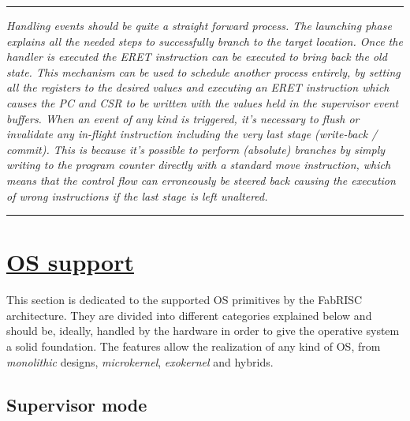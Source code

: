 \documentclass{article}
\begin{document}
        \par\noindent\rule{\textwidth}{0.4pt}
        \textit{Handling events should be quite a straight forward process. The launching phase explains all the needed steps to successfully branch to the target location. Once the handler is executed the ERET instruction can be executed to bring back the old state. This mechanism can be used to schedule another process entirely, by setting all the registers to the desired values and executing an ERET instruction which causes the PC and CSR to be written with the values held in the supervisor event buffers. When an event of any kind is triggered, it's necessary to flush or invalidate any in-flight instruction including the very last stage (write-back / commit). This is because it's possible to perform (absolute) branches by simply writing to the program counter directly with a standard move instruction, which means that the control flow can erroneously be steered back causing the execution of wrong instructions if the last stage is left unaltered.}
        \par\noindent\rule{\textwidth}{0.4pt}

        \vspace{10pt}
        
        \vspace{10pt}
        \vspace{10pt}

    \clearpage

    \section[OS support]{\LARGE\underline{OS support}} %

        \vspace{10pt}

        This section is dedicated to the supported OS primitives by the FabRISC architecture. They are divided into different categories explained below and should be, ideally, handled by the hardware in order to give the operative system a solid foundation. The features allow the realization of any kind of OS, from \textit{monolithic} designs, \textit{microkernel}, \textit{exokernel} and hybrids.

        \subsection{Supervisor mode}
\end{document}
